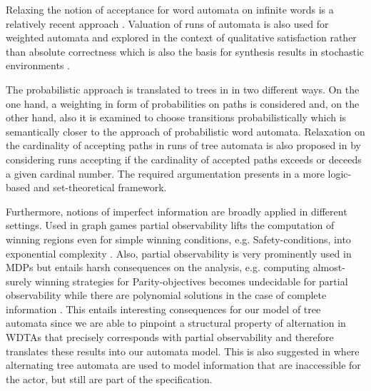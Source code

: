 Relaxing the notion of acceptance for word automata on infinite words is a
relatively recent approach \cite{PBAcoin,Groesser,RecOmeLangProbAuto,%
DecProblemsForProbAuto}. Valuation of runs of automata is also used for
weighted automata \cite{MaxSumSemanticsWeightedAutomata} and explored in the
context of qualitative satisfaction rather than absolute correctness
\cite{DecWeightedAutomata} which is also the basis for synthesis results in
stochastic environments \cite{HighQualSynStochEnv}.

The probabilistic approach is translated to trees in \cite{RandAutoInfTrees,%
QualTreeLang} in two different ways. On the one hand, a weighting in form of
probabilities on paths is considered and, on the other hand, also it is
examined to choose transitions probabilistically which is semantically closer
to the approach of probabilistic word automata. Relaxation on the cardinality
of accepting paths in runs of tree automata is also proposed in
\cite{CardinalsForTreePaths} by considering runs accepting if the cardinality
of accepted paths exceeds or deceeds a given cardinal number. The required
argumentation presents in a more logic-based and set-theoretical framework.

Furthermore, notions of imperfect information are broadly applied in different
settings. Used in graph games partial observability lifts the computation of
winning regions even for simple winning conditions, e.g. Safety-conditions,
into exponential complexity \cite{PowerOfImperfectInformation}. Also, partial
observability is very prominently used in \aclp*{MDP} \cite{RandomnessForFree,%
ActingOptimallyInPOSD, QualAnaPOMDP} but entails harsh consequences on the
analysis, e.g. computing almost-surely winning strategies for Parity-objectives
becomes undecidable for partial observability while there are polynomial
solutions in the case of complete information \cite{QualAnaPOMDP,%
QuanStochParityGames, ContrSynProbSys}. This entails interesting consequences
for our model of tree automata since we are able to pinpoint a structural
property of alternation in \aclp*{WDTA} that precisely corresponds with partial
observability and therefore translates these results into our automata model.
This is also suggested in \cite{ChurchsProblemRevisited} where alternating tree
automata are used to model information that are inaccessible for the actor, but
still are part of the specification.

